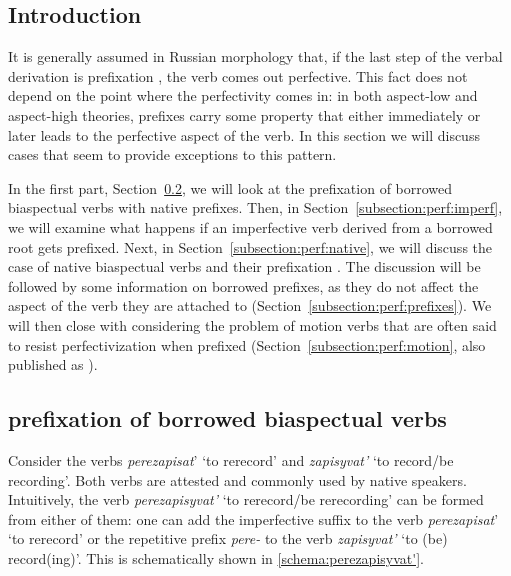 \subsection{Introduction}
It is generally assumed in Russian morphology that, if the last step of the verbal derivation is prefixation , the verb comes out perfective. This fact does not depend on the point where the perfectivity comes in: in both aspect-low \citep[][among others]{Verkuyl:95, Pinon:01, Ramchand:04} and aspect-high \citep{Paslawska:03, Gronn:10, Tatevosov:11} theories, prefixes carry some property that either immediately or later leads to the perfective aspect of the verb. In this section we will discuss cases that seem to provide exceptions to this pattern.

In the first part, Section~\ref{subsection:perf:borrowed}, we will look at the prefixation  of borrowed biaspectual verbs    with native prefixes. Then, in Section~\ref{subsection:perf:imperf}, we will examine what happens if an imperfective verb  derived from a borrowed root gets prefixed. Next, in Section~\ref{subsection:perf:native}, we will discuss the case of native biaspectual verbs   and their prefixation . The discussion will be followed by some information on borrowed prefixes, as they do not affect the aspect of the verb they are attached to (Section~\ref{subsection:perf:prefixes}). We will then close with considering the problem of motion verbs that are often said to resist perfectivization  when prefixed (Section~\ref{subsection:perf:motion}, also published as \citealt{ZinovaOsswald:paper}).

\subsection{prefixation  of borrowed biaspectual verbs   }\label{subsection:perf:borrowed}
Consider the verbs \textit{perezapisat}'\textsuperscript{\PF} `to rerecord' and \textit{zapisyvat'}\textsuperscript{\IPF} `to  record/be recording'. Both verbs are attested and commonly used by native speakers. Intuitively, the verb \textit{perezapisyvat'} `to rerecord/be rerecording' can be formed from either of them: one can add the imperfective suffix   to the verb \textit{perezapisat}'\textsuperscript{\PF} `to rerecord' or the repetitive  prefix \textit{pere-}   to the verb \textit{zapisyvat'}\textsuperscript{\IPF} `to (be) record(ing)'. This is schematically shown in \ref{schema:perezapisyvat'}.

